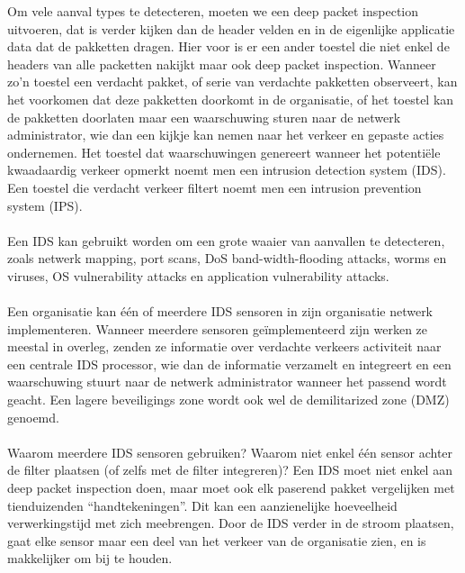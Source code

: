 Om vele aanval types te detecteren, moeten we een deep packet inspection uitvoeren, dat is verder kijken dan de header velden en in de eigenlijke applicatie data dat de pakketten dragen.
Hier voor is er een ander toestel die niet enkel de headers van alle packetten nakijkt maar ook deep packet inspection. Wanneer zo’n toestel een verdacht pakket, of serie van verdachte pakketten observeert, kan het voorkomen dat deze pakketten doorkomt in de organisatie, of het toestel kan de pakketten doorlaten maar een waarschuwing sturen naar de netwerk administrator, wie dan een kijkje kan nemen naar het verkeer en gepaste acties ondernemen.
Het toestel dat waarschuwingen genereert wanneer het potentiële kwaadaardig verkeer opmerkt noemt men een intrusion detection system (IDS). Een toestel die verdacht verkeer filtert noemt men een intrusion prevention system (IPS).
\\\\
Een IDS kan gebruikt worden om een grote waaier van aanvallen te detecteren, zoals netwerk mapping, port scans, DoS band-width-flooding attacks, worms en viruses, OS vulnerability attacks en application vulnerability attacks.
\\\\
Een organisatie kan één of meerdere IDS sensoren in zijn organisatie netwerk implementeren. Wanneer meerdere sensoren geïmplementeerd zijn werken ze meestal in overleg, zenden ze informatie over verdachte verkeers activiteit naar een centrale IDS processor, wie dan de informatie verzamelt en integreert en een waarschuwing stuurt naar de netwerk administrator wanneer het passend wordt geacht. Een lagere beveiligings zone wordt ook wel de demilitarized zone (DMZ) genoemd.
\\\\
Waarom meerdere IDS sensoren gebruiken? Waarom niet enkel één sensor achter de filter plaatsen (of zelfs met de filter integreren)? Een IDS moet niet enkel aan deep packet inspection doen, maar moet ook elk paserend pakket vergelijken met tienduizenden “handtekeningen”. Dit kan een aanzienelijke hoeveelheid verwerkingstijd met zich meebrengen. Door de IDS verder in de stroom plaatsen, gaat elke sensor maar een deel van het verkeer van de organisatie zien, en is makkelijker om bij te houden.
\\\\
